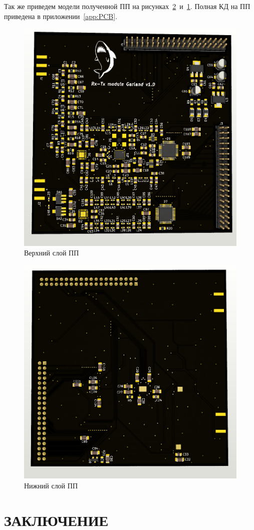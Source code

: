 \documentclass[utf8x, 14pt, oneside, a4paper]{article}
\begin{document}
		Так же приведем модели полученной ПП на рисунках~\ref{fig:sdrb}~и~\ref{fig:sdrt}. Полная КД на ПП приведена в приложении~\ref{app:PCB}.
		\begin{figure}[h!]
			\centering
			\includegraphics[width=0.6\linewidth]{SDRтоп}
			\caption{Верхний слой ПП}
			\label{fig:sdrt}
		\end{figure}
		\begin{figure}[h!]
			\centering
			\includegraphics[width=0.6\linewidth]{SDRбот}
			\caption{Нижний слой ПП}
			\label{fig:sdrb}
		\end{figure}
		
		
		
		
	\pagebreak 
	
	\quad
	
	\newpage 
	\section*{ЗАКЛЮЧЕНИЕ}
	
\end{document}
